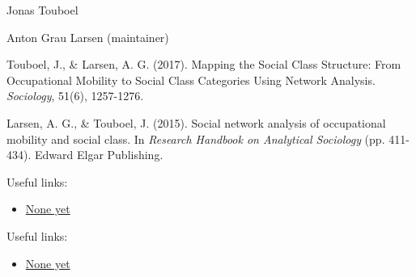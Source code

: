 \documentclass[a4paper]{book}
\begin{document}
%
\begin{Author}
Jonas Touboel 

Anton Grau Larsen  (maintainer)
\end{Author}
%
\begin{References}
Touboel, J., \& Larsen, A. G. (2017). Mapping the Social Class Structure: 
From Occupational Mobility to Social Class Categories Using Network Analysis.
\emph{Sociology}, 51(6), 1257-1276. 

Larsen, A. G., \& Touboel, J. (2015). Social network analysis of occupational 
mobility and social class. In \emph{Research Handbook on Analytical Sociology} 
(pp. 411-434). Edward Elgar Publishing.
\end{References}
%
\begin{SeeAlso}
Useful links:
\begin{itemize}

\item{} \url{None yet}

\end{itemize}



Useful links:
\begin{itemize}

\item{} \url{None yet}

\end{itemize}


\end{SeeAlso}
%
\end{document}
